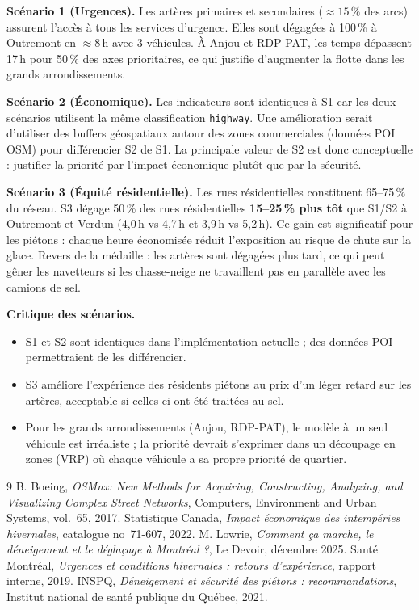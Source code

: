 \documentclass[11pt,a4paper]{article}
\begin{document}
\noindent\textbf{Sc\'enario 1 (Urgences).}
Les art\`eres primaires et secondaires ($\approx 15\,\%$ des arcs) assurent
l'acc\`es \`a tous les services d'urgence. Elles sont d\'egag\'ees \`a 100\,\%
\`a Outremont en $\approx 8$\,h avec 3 v\'ehicules. \`A Anjou et RDP-PAT,
les temps d\'epassent 17\,h pour 50\,\% des axes prioritaires, ce qui justifie
d'augmenter la flotte dans les grands arrondissements.

\noindent\textbf{Sc\'enario 2 (\'Economique).}
Les indicateurs sont identiques \`a S1 car les deux sc\'enarios utilisent la
m\^eme classification \texttt{highway}. Une am\'elioration serait d'utiliser
des buffers g\'eospatiaux autour des zones commerciales (donn\'ees POI OSM) pour
diff\'erencier S2 de S1. La principale valeur de S2 est donc conceptuelle :
justifier la priorit\'e par l'impact \'economique plut\^ot que par la s\'ecurit\'e.

\noindent\textbf{Sc\'enario 3 (\'Equit\'e r\'esidentielle).}
Les rues r\'esidentielles constituent 65--75\,\% du r\'eseau. S3 d\'egage
50\,\% des rues r\'esidentielles \textbf{15--25\,\% plus t\^ot} que S1/S2
\`a Outremont et Verdun (4,0\,h vs 4,7\,h et 3,9\,h vs 5,2\,h). Ce gain
est significatif pour les pi\'etons : chaque heure \'economis\'ee r\'eduit
l'exposition au risque de chute sur la glace.
Revers de la m\'edaille : les art\`eres sont d\'egag\'ees plus tard, ce qui
peut g\^ener les navetteurs si les chasse-neige ne travaillent pas en parall\`ele
avec les camions de sel.

\noindent\textbf{Critique des sc\'enarios.}
\begin{itemize}
  \item S1 et S2 sont identiques dans l'impl\'ementation actuelle ;
    des donn\'ees POI permettraient de les diff\'erencier.
  \item S3 am\'eliore l'exp\'erience des r\'esidents pi\'etons au prix d'un l\'eger
    retard sur les art\`eres, acceptable si celles-ci ont \'et\'e trait\'ees au sel.
  \item Pour les grands arrondissements (Anjou, RDP-PAT), le mod\`ele \`a un seul
    v\'ehicule est irr\'ealiste ; la priorit\'e devrait s'exprimer dans un
    d\'ecoupage en zones (VRP) o\`u chaque v\'ehicule a sa propre priorit\'e
    de quartier.
\end{itemize}

\begin{thebibliography}{9}
  B. Boeing,
  \textit{OSMnx: New Methods for Acquiring, Constructing, Analyzing, and
  Visualizing Complex Street Networks},
  Computers, Environment and Urban Systems, vol.~65, 2017.
  Statistique Canada,
  \textit{Impact \'economique des intemp\'eries hivernales},
  catalogue no~71-607, 2022.
  M. Lowrie,
  \textit{Comment \c{c}a marche, le d\'eneigement et le d\'egla\c{c}age
  \`a Montr\'eal ?},
  Le Devoir, d\'ecembre 2025.
  Sant\'e Montr\'eal,
  \textit{Urgences et conditions hivernales : retours d'exp\'erience},
  rapport interne, 2019.
  INSPQ,
  \textit{D\'eneigement et s\'ecurit\'e des pi\'etons : recommandations},
  Institut national de sant\'e publique du Qu\'ebec, 2021.
\end{thebibliography}
\end{document}
